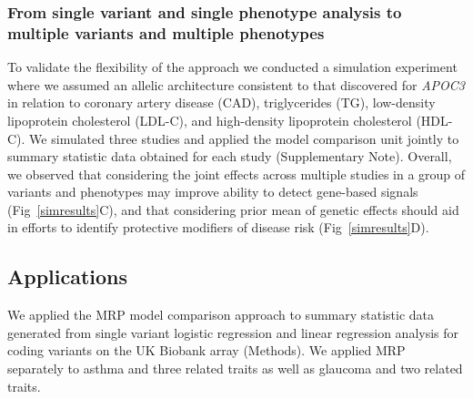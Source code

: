 \subsubsection*{From single variant and single phenotype analysis to multiple variants and multiple phenotypes}
To validate the flexibility of the approach we conducted a simulation experiment where we assumed an allelic architecture consistent to that discovered for {\it APOC3} in relation to coronary artery disease (CAD), triglycerides (TG), low-density lipoprotein cholesterol (LDL-C), and high-density lipoprotein cholesterol (HDL-C)\cite{apoc3,apoc32,jorgensen2014loss,cohorts2014loss}. We simulated three studies and applied the model comparison unit jointly to summary statistic data obtained for each study (Supplementary Note). Overall, we observed that considering the joint effects across multiple studies in a group of variants and phenotypes may improve ability to detect gene-based signals (Fig~\ref{simresults}C), and that considering prior mean of genetic effects should aid in efforts to identify protective modifiers of disease risk (Fig~\ref{simresults}D).

\subsection*{Applications}
We applied the MRP model comparison approach to summary statistic data generated from single variant logistic regression and linear regression analysis for coding variants on the UK Biobank array (Methods). We applied MRP separately to asthma and three related traits as well as glaucoma and two related traits.

